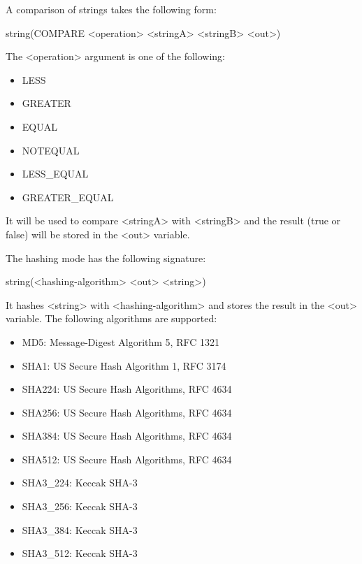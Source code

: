 
A comparison of strings takes the following form:

\begin{cmake}
string(COMPARE <operation> <stringA> <stringB> <out>)
\end{cmake}

The <operation> argument is one of the following:

\begin{itemize}
\item
LESS

\item
GREATER

\item
EQUAL

\item
NOTEQUAL

\item
LESS\_EQUAL

\item
GREATER\_EQUAL
\end{itemize}

It will be used to compare <stringA> with <stringB> and the result (true or false) will be stored in the <out> variable.


The hashing mode has the following signature:

\begin{cmake}
string(<hashing-algorithm> <out> <string>)
\end{cmake}

It hashes <string> with <hashing-algorithm> and stores the result in the <out> variable. The following algorithms are supported:

\begin{itemize}
\item
MD5: Message-Digest Algorithm 5, RFC 1321

\item
SHA1: US Secure Hash Algorithm 1, RFC 3174

\item
SHA224: US Secure Hash Algorithms, RFC 4634

\item
SHA256: US Secure Hash Algorithms, RFC 4634

\item
SHA384: US Secure Hash Algorithms, RFC 4634

\item
SHA512: US Secure Hash Algorithms, RFC 4634

\item
SHA3\_224: Keccak SHA-3

\item
SHA3\_256: Keccak SHA-3

\item
SHA3\_384: Keccak SHA-3

\item
SHA3\_512: Keccak SHA-3
\end{itemize}

